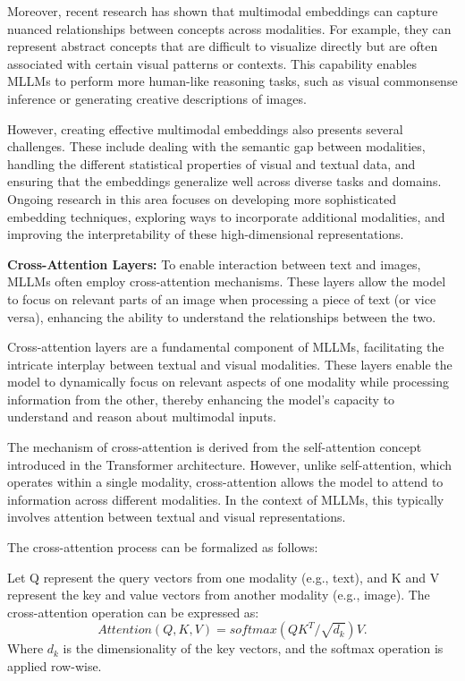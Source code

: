 Moreover, recent research has shown that multimodal embeddings can capture nuanced relationships between concepts across modalities. For example, they can represent abstract concepts that are difficult to visualize directly but are often associated with certain visual patterns or contexts. This capability enables MLLMs to perform more human-like reasoning tasks, such as visual commonsense inference or generating creative descriptions of images.

However, creating effective multimodal embeddings also presents several challenges. These include dealing with the semantic gap between modalities, handling the different statistical properties of visual and textual data, and ensuring that the embeddings generalize well across diverse tasks and domains. Ongoing research in this area focuses on developing more sophisticated embedding techniques, exploring ways to incorporate additional modalities, and improving the interpretability of these high-dimensional representations.


\textbf{Cross-Attention Layers:} To enable interaction between text and images, MLLMs often employ cross-attention mechanisms. These layers allow the model to focus on relevant parts of an image when processing a piece of text (or vice versa), enhancing the ability to understand the relationships between the two.

Cross-attention layers are a fundamental component of MLLMs, facilitating the intricate interplay between textual and visual modalities. These layers enable the model to dynamically focus on relevant aspects of one modality while processing information from the other, thereby enhancing the model's capacity to understand and reason about multimodal inputs.

The mechanism of cross-attention is derived from the self-attention concept introduced in the Transformer architecture. However, unlike self-attention, which operates within a single modality, cross-attention allows the model to attend to information across different modalities. In the context of MLLMs, this typically involves attention between textual and visual representations.

The cross-attention process can be formalized as follows:

Let Q represent the query vectors from one modality (e.g., text), and K and V represent the key and value vectors from another modality (e.g., image). The cross-attention operation can be expressed as:
\begin{equation}
    Attention(Q, K, V) = softmax(Q{K^T} / \sqrt{d_k})V.
\end{equation}
Where $d_k$ is the dimensionality of the key vectors, and the softmax operation is applied row-wise.

